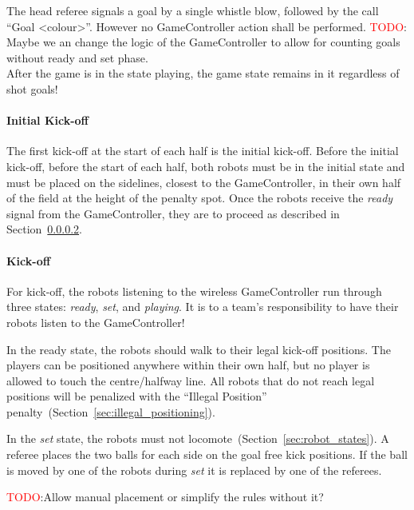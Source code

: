 The head referee signals a goal by a single whistle blow, followed by the call ``Goal \textless colour\textgreater''. However no GameController action shall be performed. \textcolor{red}{TODO}: Maybe we an change the logic of the GameController to allow for counting goals without ready and set phase. \\
After the game is in the state playing, the game state remains in it regardless of shot goals!


\paragraph{Initial Kick-off}
\label{sec:initial-kick-off}

The first kick-off at the start of each half is the initial kick-off.
Before the initial kick-off, \ie before the start of each half, both robots must be in the initial state and must be placed on the sidelines, closest to the GameController, in their own half of the field at the height of the penalty spot. 
Once the robots receive the \emph{ready} signal from the GameController, they are to proceed as described in Section~\ref{sec:kick-off}.

\paragraph{Kick-off}
\label{sec:kick-off}
For kick-off, the robots listening to the wireless GameController run through three states: \emph{ready}, \emph{set}, and \emph{playing}. It is to a team's responsibility to have their robots listen to the GameController!

In the ready state, the robots should walk to their legal kick-off positions.
The players can be positioned anywhere within their own half, but no player is allowed to touch the centre/halfway line. All robots that do not reach legal positions will be penalized with the ``Illegal Position'' penalty~(\cf Section~\ref{sec:illegal_positioning}).

In the \emph{set} state, the robots must not locomote~(\cf Section~\ref{sec:robot_states}). A referee places the two balls for each side on the goal free kick positions.%
If the ball is moved by one of the robots during \emph{set} it is replaced by one of the referees.

\textcolor{red}{TODO}:Allow manual placement or simplify the rules without it?

